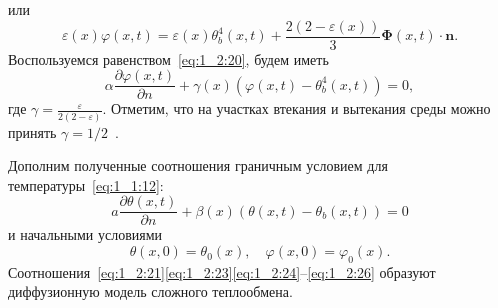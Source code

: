 или
\[
    \varepsilon(x) \varphi(x, t)=\varepsilon(x) \theta_{b}^{4}(x, t)+
    \frac{2(2-\varepsilon(x))}{3} \boldsymbol{\Phi}(x, t) \cdot \mathbf{n}.
\]
Воспользуемся равенством~\eqref{eq:1_2:20}, будем иметь
\begin{equation}
    \label{eq:1_2:24}
    \alpha \frac{\partial \varphi(x, t)}{\partial n}+
    \gamma(x)\left(\varphi(x, t)-\theta_{b}^{4}(x, t)\right)=0,
\end{equation}
где $\gamma=\frac{\varepsilon}{2(2-\varepsilon)}$.
Отметим, что на участках втекания и вытекания среды
можно принять $\gamma=1/2$~\cite{JVM-14}.


Дополним полученные соотношения граничным условием для температуры~\eqref{eq:1_1:12}:
\begin{equation}
    \label{eq:1_2:25}
    a \frac{\partial \theta(x, t)}{\partial n}
    +\beta(x)\left(\theta(x, t)-\theta_{b}(x, t)\right)=0
\end{equation}
и начальными условиями
\begin{equation}
    \label{eq:1_2:26}
    \theta(x, 0)=\theta_{0}(x), \quad \varphi(x, 0)=\varphi_{0}(x).
\end{equation}
Соотношения~\eqref{eq:1_2:21}\eqref{eq:1_2:23}\eqref{eq:1_2:24}--\eqref{eq:1_2:26}
образуют диффузионную модель сложного теплообмена.

\FloatBarrier
